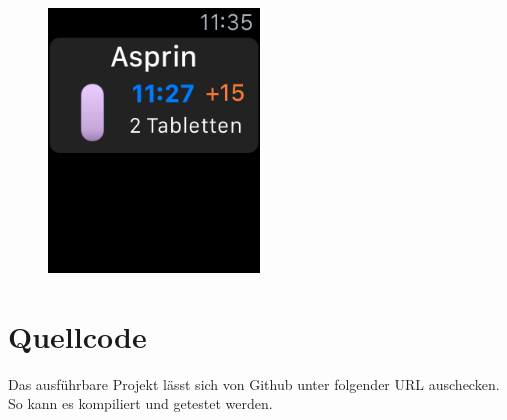 \begin{figure}
	\includegraphics[width=0.5\textwidth]{04_realisation/screenshots/watch/delay04.png}
\end{figure}

\section{Quellcode}
Das ausführbare Projekt lässt sich von Github unter folgender URL\cite{Schmidt:repoCode} auschecken. So kann es kompiliert und getestet werden. 

